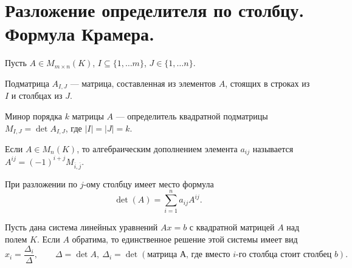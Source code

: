 \section{Разложение определителя по столбцу. Формула Крамера.}
\begin{defn}[Минор]
    Пусть $ A \in M_{m\times n}(K)$, $ I \subseteq \{1, \ldots m\}$, $ J \in \{1, \ldots n\}$. 

    {\sf Подматрица $ A_{I, J}$} --- матрица, составленная из элементов $ A$, стоящих в строках из $ I$ и столбцах из  $ J$. 

    {\sf Минор порядка $ k$} матрицы $ A$ --- определитель квадратной подматрицы     $ M_{I, J} = \det A_{I, J}$, где $ \lvert I \rvert = \lvert J \rvert = k$. 

    Если $ A \in M_n(K)$, то {\sf алгебраическим дополнением элемента $ a_{ij}$} называется $ A^{ij} = (-1)^{i+j}M_{\overline{i}, \overline{j}}$. 
\end{defn}

\begin{lm}
    При разложении по $ j$-ому столбцу имеет место формула
    \[
	\det (A) = \sum_{i=1}^{n} a_{ij}A^{ij}
    .\] 
\end{lm}
\begin{thm}
    Пусть дана система линейных уравнений $ Ax = b$ с квадратной матрицей  $ A$ над полем  $ K$. Если  $ A$ обратима, то единственное решение этой системы имеет вид
     \[
     x_{i} = \frac{\Delta _i}{\Delta }, \qquad \Delta  = \det A, ~ \Delta _i = \det \left( \text{матрица А, где вместо } i\text{-го столбца стоит столбец } b  \right)   
    .\] 
\end{thm}
